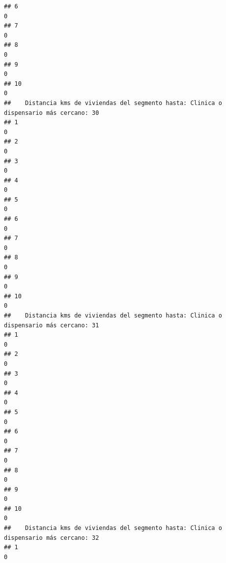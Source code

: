 \documentclass[11pt,]{article}
\begin{document}
\begin{verbatim}
## 6                                                                                     0
## 7                                                                                     0
## 8                                                                                     0
## 9                                                                                     0
## 10                                                                                    0
##    Distancia kms de viviendas del segmento hasta: Clinica o dispensario más cercano: 30
## 1                                                                                     0
## 2                                                                                     0
## 3                                                                                     0
## 4                                                                                     0
## 5                                                                                     0
## 6                                                                                     0
## 7                                                                                     0
## 8                                                                                     0
## 9                                                                                     0
## 10                                                                                    0
##    Distancia kms de viviendas del segmento hasta: Clinica o dispensario más cercano: 31
## 1                                                                                     0
## 2                                                                                     0
## 3                                                                                     0
## 4                                                                                     0
## 5                                                                                     0
## 6                                                                                     0
## 7                                                                                     0
## 8                                                                                     0
## 9                                                                                     0
## 10                                                                                    0
##    Distancia kms de viviendas del segmento hasta: Clinica o dispensario más cercano: 32
## 1                                                                                     0

\end{verbatim}
\end{document}
